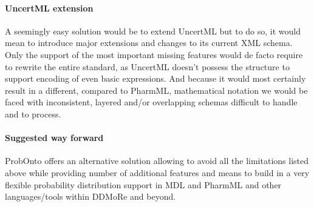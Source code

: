 \paragraph{UncertML extension} A seemingly easy solution would be to extend UncertML 
but to do so, it would mean to introduce major extensions and changes to its 
current XML schema. Only the support of the most important missing features would 
de facto require to rewrite the entire standard, as UncertML doesn't possess the 
structure to support encoding of even basic expressions. And because it would most 
certainly result in a different, compared to PharmML, mathematical notation we would 
be faced with inconsistent, layered and/or overlapping schemas difficult to handle and 
to process.

\paragraph{Suggested way forward} ProbOnto offers an alternative solution allowing
to avoid all the limitations listed above while providing number of additional features
and means to build in a very flexible probability distribution support in MDL and PharmML 
and other languages/tools within DDMoRe and beyond. 

